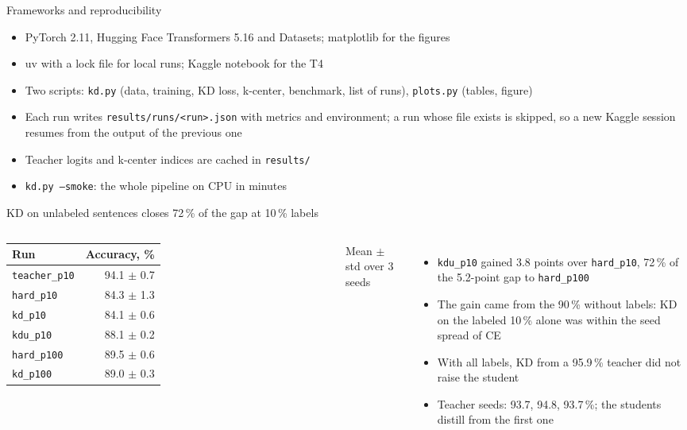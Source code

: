 \documentclass[aspectratio=169,11pt]{beamer}
\begin{document}
\begin{frame}{Frameworks and reproducibility}
  \begin{itemize}
    \item PyTorch 2.11, Hugging Face Transformers 5.16 and Datasets; matplotlib for the figures
    \item uv with a lock file for local runs; Kaggle notebook for the T4
    \item Two scripts: \texttt{kd.py} (data, training, KD loss, k-center, benchmark, list of runs), \texttt{plots.py} (tables, figure)
    \item Each run writes \texttt{results/runs/<run>.json} with metrics and environment; a run whose file exists is skipped, so a new Kaggle session resumes from the output of the previous one
    \item Teacher logits and k-center indices are cached in \texttt{results/}
    \item \texttt{kd.py --smoke}: the whole pipeline on CPU in minutes
  \end{itemize}
\end{frame}

\begin{frame}{KD on unlabeled sentences closes 72\,\% of the gap at 10\,\% labels}
  \begin{columns}[T]
    \small
    \begin{tabular}{lr}
      \toprule
      Run & Accuracy, \% \\
      \midrule
      \texttt{teacher\_p10} & 94.1 $\pm$ 0.7 \\
      \texttt{hard\_p10} & 84.3 $\pm$ 1.3 \\
      \texttt{kd\_p10} & 84.1 $\pm$ 0.6 \\
      \texttt{kdu\_p10} & 88.1 $\pm$ 0.2 \\
      \texttt{hard\_p100} & 89.5 $\pm$ 0.6 \\
      \texttt{kd\_p100} & 89.0 $\pm$ 0.3 \\
      \bottomrule
    \end{tabular}

    \footnotesize Mean $\pm$ std over 3 seeds
    \begin{itemize}
      \item \texttt{kdu\_p10} gained 3.8 points over \texttt{hard\_p10}, 72\,\% of the 5.2-point gap to \texttt{hard\_p100}
      \item The gain came from the 90\,\% without labels: KD on the labeled 10\,\% alone was within the seed spread of CE
      \item With all labels, KD from a 95.9\,\% teacher did not raise the student
      \item Teacher seeds: 93.7, 94.8, 93.7\,\%; the students distill from the first one
    \end{itemize}
  \end{columns}
\end{frame}
\end{document}
